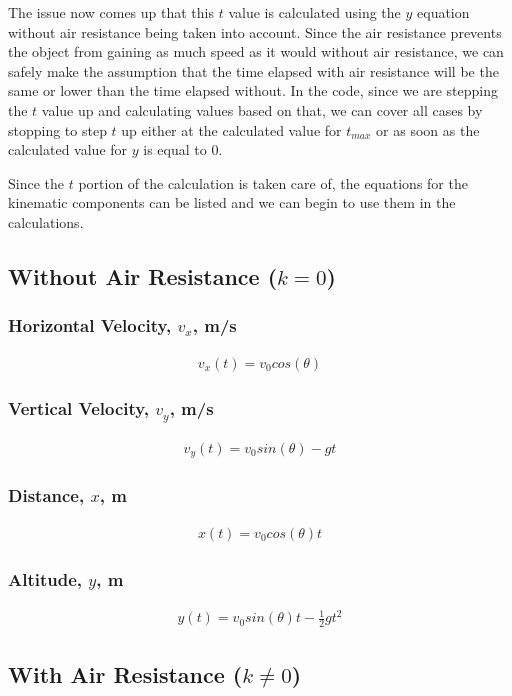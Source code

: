 \documentclass[oneside]{article}
\begin{document}
The issue now comes up that this $t$ value is calculated using the $y$ equation without air resistance being taken into account. Since the air resistance prevents the object from gaining as much speed as it would without air resistance, we can safely make the assumption that the time elapsed with air resistance will be the same or lower than the time elapsed without. In the code, since we are stepping the $t$ value up and calculating values based on that, we can cover all cases by stopping to step $t$ up either at the calculated value for $t_{max}$ or as soon as the calculated value for $y$ is equal to 0. 

Since the $t$ portion of the calculation is taken care of, the equations for the  kinematic components can be listed and we can begin to use them in the calculations.

\subsection{Without Air Resistance ($k = 0$)}
\subsubsection{Horizontal Velocity, $v_x$, m/s}
\begin{align}
    v_x(t) = v_0cos(\theta)
\end{align}
\subsubsection{Vertical Velocity, $v_y$, m/s}
\begin{align}
    v_y(t) = v_0sin(\theta) - gt
\end{align}
\subsubsection{Distance, $x$, m}
\begin{align}
    x(t) = v_0cos(\theta)t
\end{align}
\subsubsection{Altitude, $y$, m}
\begin{align}
    y(t) = v_0sin(\theta)t - \frac{1}{2}gt^2
\end{align}

\subsection{With Air Resistance ($k \neq 0$)}
\end{document}
